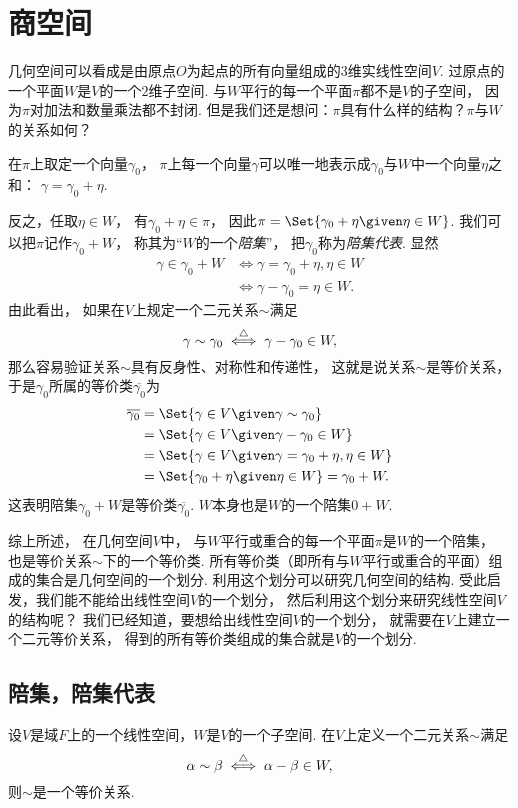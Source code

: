 \section{商空间}
几何空间可以看成是由原点\(O\)为起点的所有向量组成的\(3\)维实线性空间\(V\).
过原点的一个平面\(W\)是\(V\)的一个\(2\)维子空间.
与\(W\)平行的每一个平面\(\pi\)都不是\(V\)的子空间，
因为\(\pi\)对加法和数量乘法都不封闭.
但是我们还是想问：\(\pi\)具有什么样的结构？\(\pi\)与\(W\)的关系如何？

在\(\pi\)上取定一个向量\(\gamma_0\)，
\(\pi\)上每一个向量\(\gamma\)可以唯一地表示成\(\gamma_0\)与\(W\)中一个向量\(\eta\)之和：
\(\gamma=\gamma_0+\eta\).

反之，任取\(\eta\in W\)，
有\(\gamma_0+\eta\in\pi\)，
因此\(\pi=\Set{ \gamma_0+\eta \given \eta\in W }\).
我们可以把\(\pi\)记作\(\gamma_0+W\)，
称其为“\(W\)的一个\emph{陪集}”，
把\(\gamma_0\)称为\emph{陪集代表}.
显然\begin{align*}
	\gamma\in\gamma_0+W
	&\iff
	\gamma=\gamma_0+\eta,\eta\in W \\
	&\iff
	\gamma-\gamma_0=\eta\in W.
\end{align*}
由此看出，
如果在\(V\)上规定一个二元关系\(\sim\)满足\[
	\gamma\sim\gamma_0
	\overset{\triangle}{\iff}
	\gamma-\gamma_0\in W,
\]
那么容易验证关系\(\sim\)具有反身性、对称性和传递性，
这就是说关系\(\sim\)是等价关系，
于是\(\gamma_0\)所属的等价类\(\overline{\gamma_0}\)为\begin{align*}
	\overline{\gamma_0}
	&=\Set{ \gamma\in V \given \gamma\sim\gamma_0 } \\
	&=\Set{ \gamma\in V \given \gamma-\gamma_0\in W } \\
	&=\Set{ \gamma\in V \given \gamma=\gamma_0+\eta,\eta\in W } \\
	&=\Set{ \gamma_0+\eta \given \eta\in W }
	=\gamma_0+W.
\end{align*}
这表明陪集\(\gamma_0+W\)是等价类\(\overline{\gamma_0}\).
\(W\)本身也是\(W\)的一个陪集\(0+W\).

综上所述，
在几何空间\(V\)中，
与\(W\)平行或重合的每一个平面\(\pi\)是\(W\)的一个陪集，
也是等价关系\(\sim\)下的一个等价类.
所有等价类（即所有与\(W\)平行或重合的平面）组成的集合是几何空间的一个划分.
利用这个划分可以研究几何空间的结构.
受此启发，我们能不能给出线性空间\(V\)的一个划分，
然后利用这个划分来研究线性空间\(V\)的结构呢？
我们已经知道，要想给出线性空间\(V\)的一个划分，
就需要在\(V\)上建立一个二元等价关系，
得到的所有等价类组成的集合就是\(V\)的一个划分.

\subsection{陪集，陪集代表}
设\(V\)是域\(F\)上的一个线性空间，\(W\)是\(V\)的一个子空间.
在\(V\)上定义一个二元关系\(\sim\)满足\[
	\alpha\sim\beta
	\overset{\triangle}{\iff}
	\alpha-\beta\in W,
\]
则\(\sim\)是一个等价关系.

